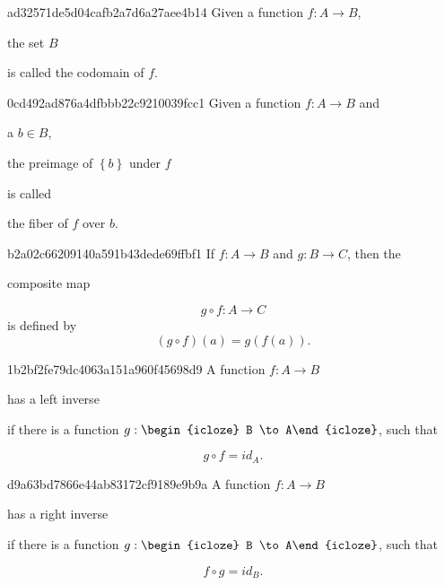 \begin{note}{ad32571de5d04cafb2a7d6a27aee4b14}
    Given a function \({ f : A \to B }\), \begin{icloze}{1}the set \({ B }\)\end{icloze} is called the codomain of \({ f }\).
\end{note}

\begin{note}{0cd492ad876a4dfbbb22c9210039fcc1}
    Given a function \({ f : A \to B }\) and \begin{icloze}{3}a \({ b \in B }\),\end{icloze} \begin{icloze}{2}the preimage of \({ \left\{ b \right\} }\) under \({ f }\)\end{icloze} is called \begin{icloze}{1}the fiber of \({ f }\) over \({ b }\).\end{icloze}
\end{note}

\begin{note}{b2a02c66209140a591b43dede69ffbf1}
    If \({ f : A \to B }\) and \({ g : B \to C }\), then the \begin{icloze}{1}composite map\end{icloze}
    \[
        g \circ f : A \to C
    \]
    is defined by
    \[
        (g \circ f)(a) = g(f(a)).
    \]
\end{note}

\begin{note}{1b2bf2fe79dc4063a151a960f45698d9}
    A function \({ f : A \to B }\) \begin{icloze}{3}has a left inverse\end{icloze} if there is a function \({ g : \begin{icloze}{2}B \to A\end{icloze} }\), such that
    \begin{icloze}{1}
        \[
            g \circ f = id_A.
        \]
    \end{icloze}
\end{note}

\begin{note}{d9a63bd7866e44ab83172cf9189e9b9a}
    A function \({ f : A \to B }\) \begin{icloze}{3}has a right inverse\end{icloze} if there is a function \({ g : \begin{icloze}{2}B \to A\end{icloze} }\), such that
    \begin{icloze}{1}
        \[
            f \circ g = id_B.
        \]
    \end{icloze}
\end{note}

